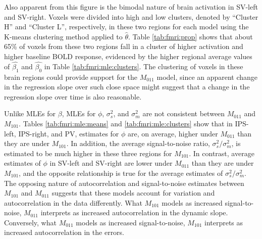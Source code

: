 Also apparent from this figure is the bimodal nature of brain activation in SV-left and SV-right. Voxels were divided into high and low clusters, denoted by ``Cluster H'' and ``Cluster L'', respectively, in these two regions for each model using the K-means clustering method \citep{hartigan:wong:kmeans:1979} applied to $\hat{\theta}$. Table \ref{tab:fmri:prop} shows that about 65\% of voxels from these two regions fall in a cluster of higher activation and higher baseline BOLD response, evidenced by the higher regional average values of $\hat{\beta_1}$ and $\hat{\beta_0}$ in Table \ref{tab:fmri:mle:clusters}. The clustering of voxels in these brain regions could provide support for the $M_{011}$ model, since an apparent change in the regression slope over such close space might suggest that a change in the regression slope over time is also reasonable.

Unlike MLEs for $\beta$, MLEs for $\phi$, $\sigma^2_s$, and $\sigma^2_m$ are not consistent between $M_{011}$ and $M_{101}$. Tables \ref{tab:fmri:mle:means} and \ref{tab:fmri:mle:clusters} show that in IPS-left, IPS-right, and PV, estimates for $\phi$ are, on average, higher under $M_{011}$ than they are under $M_{101}$.  In addition, the average signal-to-noise ratio, $\sigma^2_s / \sigma^2_m$, is estimated to be much higher in these three regions for $M_{101}$. In contrast, average estimates of $\phi$ in SV-left and SV-right are lower under $M_{011}$ than they are under $M_{101}$, and the opposite relationship is true for the average estimates of $\sigma^2_s / \sigma^2_m$. The opposing nature of autocorrelation and signal-to-noise estimates between $M_{101}$ and $M_{011}$ suggests that these models account for variation and autocorrelation in the data differently. What $M_{101}$ models as increased signal-to-noise, $M_{011}$ interprets as increased autocorrelation in the dynamic slope. Conversely, what $M_{011}$ models as increased signal-to-noise, $M_{101}$ interprets as increased autocorrelation in the errors.


